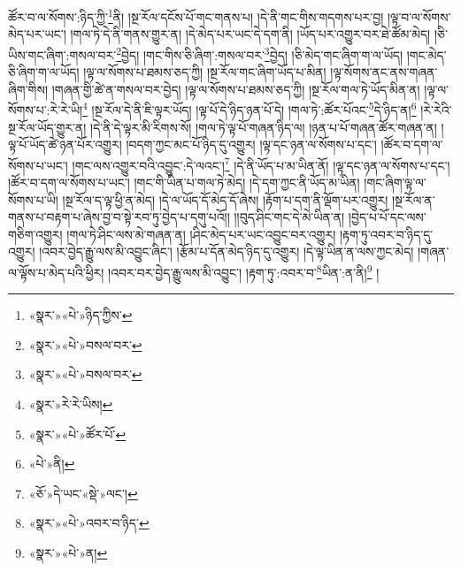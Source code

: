 ཚོར་བ་ལ་སོགས་:ཉིད་ཀྱི་\footnote{«སྣར་»«པེ་»ཉིད་ཀྱིས་}ནི། །སྔ་རོལ་དངོས་པོ་གང་གནས་པ། །དེ་ནི་གང་གིས་གདགས་པར་བྱ། །ལྟ་བ་ལ་སོགས་མེད་པར་ཡང་། །གལ་ཏེ་དེ་ནི་གནས་གྱུར་ན། །དེ་མེད་པར་ཡང་དེ་དག་ནི། །ཡོད་པར་འགྱུར་བར་ཐེ་ཚོམ་མེད། །ཅི་ཡིས་གང་ཞིག་:གསལ་བར་\footnote{«སྣར་»«པེ་»བསལ་བར་}བྱེད། །གང་གིས་ཅི་ཞིག་:གསལ་བར་\footnote{«སྣར་»«པེ་»བསལ་བར་}བྱེད། །ཅི་མེད་གང་ཞིག་ག་ལ་ཡོད། །གང་མེད་ཅི་ཞིག་ག་ལ་ཡོད། །ལྟ་ལ་སོགས་པ་ཐམས་ཅད་ཀྱི། །སྔ་རོལ་གང་ཞིག་ཡོད་པ་མིན། །ལྟ་སོགས་ནང་ནས་གཞན་ཞིག་གིས། །གཞན་གྱི་ཚེ་ན་གསལ་བར་བྱེད། །ལྟ་ལ་སོགས་པ་ཐམས་ཅད་ཀྱི། །སྔ་རོལ་གལ་ཏེ་ཡོད་མིན་ན། །ལྟ་ལ་སོགས་པ་:རེ་རེ་ཡི།\footnote{«སྣར་»རེ་རེ་ཡིས།} །སྔ་རོལ་དེ་ནི་ཇི་ལྟར་ཡོད། །ལྟ་པོ་དེ་ཉིད་ཉན་པོ་དེ། །གལ་ཏེ་:ཚོར་པོའང་\footnote{«སྣར་»«པེ་»ཚོར་པོ་}དེ་ཉིད་ན།\footnote{«པེ་»ནི།} །རེ་རེའི་སྔ་རོལ་ཡོད་གྱུར་ན། །དེ་ནི་དེ་ལྟར་མི་རིགས་སོ། །གལ་ཏེ་ལྟ་པོ་གཞན་ཉིད་ལ། །ཉན་པ་པོ་གཞན་ཚོར་གཞན་ན། །ལྟ་པོ་ཡོད་ཚེ་ཉན་པོར་འགྱུར། །བདག་ཀྱང་མང་པོ་ཉིད་དུ་འགྱུར། །ལྟ་དང་ཉན་ལ་སོགས་པ་དང་། །ཚོར་བ་དག་ལ་སོགས་པ་ཡང་། །གང་ལས་འགྱུར་བའི་འབྱུང་:དེ་ལའང་།\footnote{«ཅོ་»དེ་ཡང་«སྡེ་»ལང་།} །དེ་ནི་ཡོད་པ་མ་ཡིན་ནོ། །ལྟ་དང་ཉན་ལ་སོགས་པ་དང་། །ཚོར་བ་དག་ལ་སོགས་པ་ཡང་། །གང་གི་ཡིན་པ་གལ་ཏེ་མེད། །དེ་དག་ཀྱང་ནི་ཡོད་མ་ཡིན། །གང་ཞིག་ལྟ་ལ་སོགས་པ་ཡི། །སྔ་རོལ་ད་ལྟ་ཕྱི་ན་མེད། །དེ་ལ་ཡོད་དོ་མེད་དོ་ཞེས། །རྟོག་པ་དག་ནི་ལྡོག་པར་འགྱུར། །སྔ་རོལ་ན་གནས་པ་བརྟག་པ་ཞེས་བྱ་བ་སྟེ་རབ་ཏུ་བྱེད་པ་དགུ་པའོ།། །།བུད་ཤིང་གང་དེ་མེ་ཡིན་ན། །བྱེད་པ་པོ་དང་ལས་གཅིག་འགྱུར། །གལ་ཏེ་ཤིང་ལས་མེ་གཞན་ན། །ཤིང་མེད་པར་ཡང་འབྱུང་བར་འགྱུར། །རྟག་ཏུ་འབར་བ་ཉིད་དུ་འགྱུར། །འབར་བྱེད་རྒྱུ་ལས་མི་འབྱུང་ཞིང་། །རྩོམ་པ་དོན་མེད་ཉིད་དུ་འགྱུར། །དེ་ལྟ་ཡིན་ན་ལས་ཀྱང་མེད། །གཞན་ལ་ལྟོས་པ་མེད་པའི་ཕྱིར། །འབར་བར་བྱེད་རྒྱུ་ལས་མི་འབྱུང་། །རྟག་ཏུ་:འབར་བ་\footnote{«སྣར་»«པེ་»འབར་བ་ཉིད་}ཡིན་:ན་ནི།\footnote{«སྣར་»«པེ་»ན།} །
